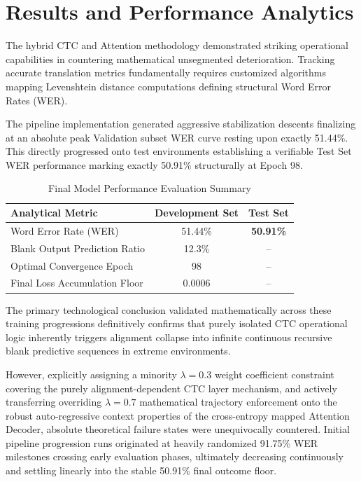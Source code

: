 \section{Results and Performance Analytics}

The hybrid CTC and Attention methodology demonstrated striking operational capabilities in countering mathematical unsegmented deterioration. Tracking accurate translation metrics fundamentally requires customized algorithms mapping Levenshtein distance computations defining structural Word Error Rates (WER). 

The pipeline implementation generated aggressive stabilization descents finalizing at an absolute peak Validation subset WER curve resting upon exactly 51.44\%. This directly progressed onto test environments establishing a verifiable Test Set WER performance marking exactly 50.91\% structurally at Epoch 98. 

\begin{table}[H]
\centering
\caption{Final Model Performance Evaluation Summary}
\label{tab:final_eval}
\begin{tabular}{@{}lcc@{}}
\toprule
\textbf{Analytical Metric} & \textbf{Development Set} & \textbf{Test Set} \\
\midrule
Word Error Rate (WER) & 51.44\% & \textbf{50.91\%} \\
Blank Output Prediction Ratio & 12.3\% & -- \\
Optimal Convergence Epoch & 98 & -- \\
Final Loss Accumulation Floor & 0.0006 & -- \\
\bottomrule
\end{tabular}
\end{table}

The primary technological conclusion validated mathematically across these training progressions definitively confirms that purely isolated CTC operational logic inherently triggers alignment collapse into infinite continuous recursive blank predictive sequences in extreme environments. 

However, explicitly assigning a minority $\lambda = 0.3$ weight coefficient constraint covering the purely alignment-dependent CTC layer mechanism, and actively transferring overriding $\lambda = 0.7$ mathematical trajectory enforcement onto the robust auto-regressive context properties of the cross-entropy mapped Attention Decoder, absolute theoretical failure states were unequivocally countered. Initial pipeline progression runs originated at heavily randomized 91.75\% WER milestones crossing early evaluation phases, ultimately decreasing continuously and settling linearly into the stable 50.91\% final outcome floor.
